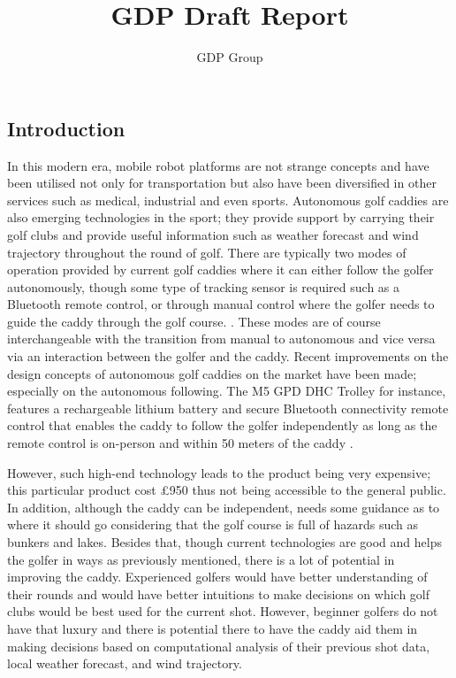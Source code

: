 \documentclass[11pt,landscape]{article}
\title{GDP Draft Report}
\author{GDP Group}
\begin{document}
\maketitle
\newpage
\begin{multicols}{3}
\tableofcontents

\section{Introduction}
In this modern era, mobile robot platforms are not strange concepts and have
been utilised not only for transportation but also have been diversified in
other services such as medical, industrial and even sports. Autonomous golf
caddies are also emerging technologies in the sport; they provide support
by carrying their golf clubs and provide useful information such as weather
forecast and wind trajectory throughout the round of golf. There are typically
two modes of operation provided by current golf caddies where it can either
follow the golfer autonomously, though some type of tracking sensor is required
such as a Bluetooth remote control, or through manual control where the
golfer needs to guide the caddy through the golf course.
\cite{choi_2020}. These modes are of course interchangeable with the transition
from manual to autonomous and vice versa via an interaction between the
golfer and the caddy. Recent improvements on the design concepts of autonomous
golf caddies on the market have been made; especially on the autonomous
following. The M5 GPD DHC Trolley for instance, features a rechargeable lithium
battery and secure Bluetooth connectivity remote control that enables the caddy
to follow the golfer independently as long as the remote control is on-person
and within 50 meters of the caddy \cite{golf_2022}.

However, such high-end technology leads to the product being very expensive;
this particular product cost £950 thus not being accessible to the general
public. In addition, although the caddy can be independent, needs some
guidance as to where it should go considering that the golf course is full of
hazards such as bunkers and lakes. Besides that, though current technologies are
good and helps the golfer in ways as previously mentioned, there is a lot of
potential in improving the caddy. Experienced golfers would have better
understanding of their rounds and would have better intuitions to make decisions
on which golf clubs would be best used for the current shot. However,
beginner golfers do not have that luxury and there is potential there to have
the caddy aid them in making decisions based on computational analysis of their
previous shot data, local weather forecast, and wind trajectory. 


\end{multicols}
\end{document}
